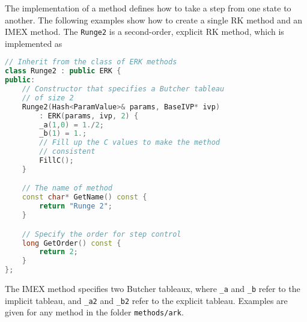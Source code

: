 \documentclass[11pt]{article}
\begin{document}
The implementation of a method defines how to take a step from one state to another. The following examples show how to create a single RK method and an IMEX method. The \verb=Runge2= is a second-order, explicit RK method, which is implemented as
\begin{lstlisting}[tabsize=4,language=c++]
// Inherit from the class of ERK methods
class Runge2 : public ERK {
public:
	// Constructor that specifies a Butcher tableau
	// of size 2
	Runge2(Hash<ParamValue>& params, BaseIVP* ivp)
		: ERK(params, ivp, 2) {
		_a(1,0) = 1./2;
		_b(1) = 1.;
		// Fill up the C values to make the method
		// consistent
		FillC();
	}

	// The name of method
	const char* GetName() const {
		return "Runge 2";
	}

	// Specify the order for step control	
	long GetOrder() const {
		return 2;
	}
};
\end{lstlisting}

The IMEX method specifies two Butcher tableaux, where \verb=_a= and \verb=_b= refer to the implicit tableau, and \verb=_a2= and \verb=_b2= refer to the explicit tableau. Examples are given for any method in the folder \verb=methods/ark=.



\end{document}
